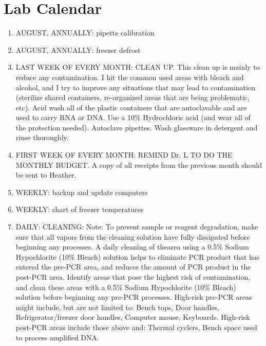 \documentclass[11pt, oneside]{article}
\begin{document}
\section{Lab Calendar}
	\begin{enumerate}
		\item AUGUST, ANNUALLY: pipette calibration
		\item AUGUST, ANNUALLY: freezer defrost
		\item LAST WEEK OF EVERY MONTH: CLEAN UP.  This clean up is mainly to reduce any contamination. I hit the common used areas with bleach and alcohol, and I try to improve any situations that may lead to contamination (sterilize shared containers, re-organized areas that are being problematic, etc).  Acid wash all of the plastic containers that are autoclavable and are used to carry RNA or DNA. Use a 10\% Hydrochloric acid (and wear all of the protection needed). Autoclave pipettes.  Wash glassware in detergent and rinse thoroughly.
		\item FIRST WEEK OF EVERY MONTH: REMIND Dr. L TO DO THE MONTHLY BUDGET.  A copy of all receipts from the previous month should be sent to Heather.
		\item WEEKLY: backup and update computers
		\item WEEKLY: chart of freezer temperatures	
		\item DAILY: CLEANING: Note: To prevent sample or reagent degradation, make sure that all vapors from the cleaning solution have fully dissipated before beginning any processes.  A daily cleaning of thearea using a 0.5\% Sodium Hypochlorite (10\% Bleach) solution helps to eliminate PCR product that has entered the pre-PCR area, and reduces the amount of PCR product in the post-PCR area.
Identify areas that pose the highest risk of contamination, and clean these areas with a 0.5\% Sodium Hypochlorite (10\% Bleach) solution before beginning any pre-PCR processes. High-risk pre-PCR areas might include, but are not limited to: Bench tops, Door handles, Refrigerator/freezer door handles, Computer mouse, Keyboards.  High-risk post-PCR areas include those above and: Thermal cyclers, Bench space used to process amplified DNA.		
		
	\end{enumerate}
	\newpage
	
\end{document}
